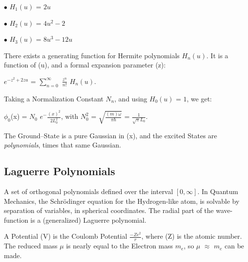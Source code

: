 \documentclass[a4paper, 10pt, onepage]{elegantbook}
\begin{document}
{$\bullet$ $H_1(u)$ = $2u$  

$\bullet$ $H_2(u)$ = $4u^2 - 2$  

$\bullet$ $H_3(u)$ = $8u^3 - 12u$  

There exists a generating function for Hermite polynomials $H_n(u)$. It is a function of (u), and a formal expansion 
parameter (z):  

$e^{-z^2 + 2zu}$ = $\sum_{n = 0}^\infty$ $\frac{z^n}{n!}$ $H_n(u)$.  

Taking a Normalization Constant $N_n$, and using $H_0(u)$ = $1$, we get:  

$\phi_0$(x) = $N_0$ $e^- {\frac{(x)^2}{2L^{2}_0}}$, with $N^{2}_0$ = $\sqrt{\frac{(m) \omega}{\pi \hbar}}$ = 
$\frac{1}{\sqrt{\pi}L_0}$. 

The Ground--State is a pure Gaussian in (x), and the excited States are \emph{polynomials}, times that same Gaussian.  



\subsection{Laguerre Polynomials}

 A set of orthogonal polynomials defined over the interval $[0, \infty]$. In Quantum Mechanics, the Schr\"odinger 
equation for the Hydrogen-like atom, is solvable by separation of variables, in spherical coordinates. The radial part 
of the wave-function is a (generalized) Laguerre polynomial.  

 A Potential (V) is the Coulomb Potential $\frac{-Ze^2}{r}$, where (Z) is the atomic number. The reduced mass $\mu$ is 
nearly equal to the Electron mass $m_e$, so $\mu$ $\approx$ $m_e$ can be made.  

}
\end{document}
